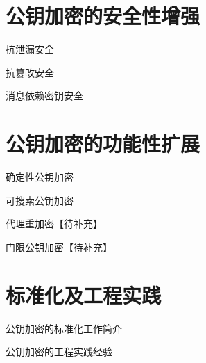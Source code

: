 \documentclass[lang=cn, cm, 10pt, scheme=chinese, bibend=bibtex, citestyle=alphabetic, bibstyle=alphabetic]{elegantbook}
\begin{document}
\chapter{公钥加密的安全性增强}
\begin{introduction}
  \item 抗泄漏安全
  \item 抗篡改安全
  \item 消息依赖密钥安全
\end{introduction}





\chapter{公钥加密的功能性扩展}
\begin{introduction}
  \item 确定性公钥加密
  \item 可搜索公钥加密
  \item 代理重加密【待补充】
  \item 门限公钥加密【待补充】
\end{introduction}



\chapter{标准化及工程实践}
\begin{introduction}
    \item 公钥加密的标准化工作简介
    \item 公钥加密的工程实践经验
\end{introduction}




\printbibliography[heading=bibintoc, title=\ebibname]

\appendix

\backmatter
\end{document}
